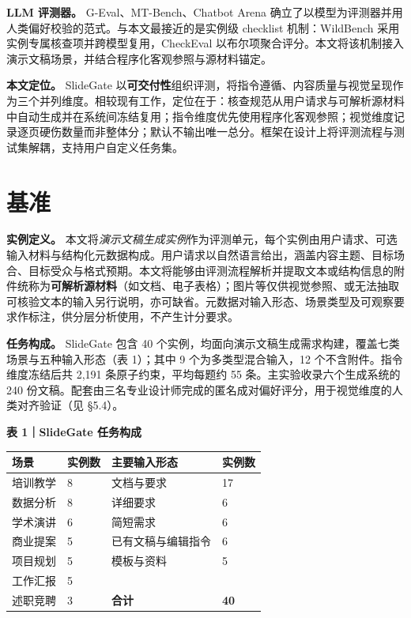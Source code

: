 \textbf{LLM 评测器。} G-Eval、MT-Bench、Chatbot Arena 确立了以模型为评测器并用人类偏好校验的范式。与本文最接近的是实例级 checklist 机制：WildBench 采用实例专属核查项并跨模型复用，CheckEval 以布尔项聚合评分。本文将该机制接入演示文稿场景，并结合程序化客观参照与源材料锚定。

\textbf{本文定位。} SlideGate 以\textbf{可交付性}组织评测，将指令遵循、内容质量与视觉呈现作为三个并列维度。相较现有工作，定位在于：核查规范从用户请求与可解析源材料中自动生成并在系统间冻结复用；指令维度优先使用程序化客观参照；视觉维度记录逐页硬伤数量而非整体分；默认不输出唯一总分。框架在设计上将评测流程与测试集解耦，支持用户自定义任务集。

\section{基准}\label{ux57faux51c6}

\textbf{实例定义。} 本文将\emph{演示文稿生成实例}作为评测单元，每个实例由用户请求、可选输入材料与结构化元数据构成。用户请求以自然语言给出，涵盖内容主题、目标场合、目标受众与格式预期。本文将能够由评测流程解析并提取文本或结构信息的附件统称为\textbf{可解析源材料}（如文档、电子表格）；图片等仅供视觉参照、或无法抽取可核验文本的输入另行说明，亦可缺省。元数据对输入形态、场景类型及可观察要求作标注，供分层分析使用，不产生计分要求。

\textbf{任务构成。} SlideGate 包含 40 个实例，均面向演示文稿生成需求构建，覆盖七类场景与五种输入形态（表 1）；其中 9 个为多类型混合输入，12 个不含附件。指令维度冻结后共 2,191 条原子约束，平均每题约 55 条。主实验收录六个生成系统的 240 份文稿。配套由三名专业设计师完成的匿名成对偏好评分，用于视觉维度的人类对齐验证（见 §5.4）。

\textbf{表 1｜SlideGate 任务构成}

{\small\setlength{\tabcolsep}{3pt} %
\begin{longtable}[]{@{}llll@{}}
\toprule\noalign{}
场景 & 实例数 & 主要输入形态 & 实例数 \\
\midrule\noalign{}
\endhead
\bottomrule\noalign{}
\endlastfoot
培训教学 & 8 & 文档与要求 & 17 \\
数据分析 & 8 & 详细要求 & 6 \\
学术演讲 & 6 & 简短需求 & 6 \\
商业提案 & 5 & 已有文稿与编辑指令 & 6 \\
项目规划 & 5 & 模板与资料 & 5 \\
工作汇报 & 5 & & \\
述职竞聘 & 3 & \textbf{合计} & \textbf{40} \\
\end{longtable}
}


